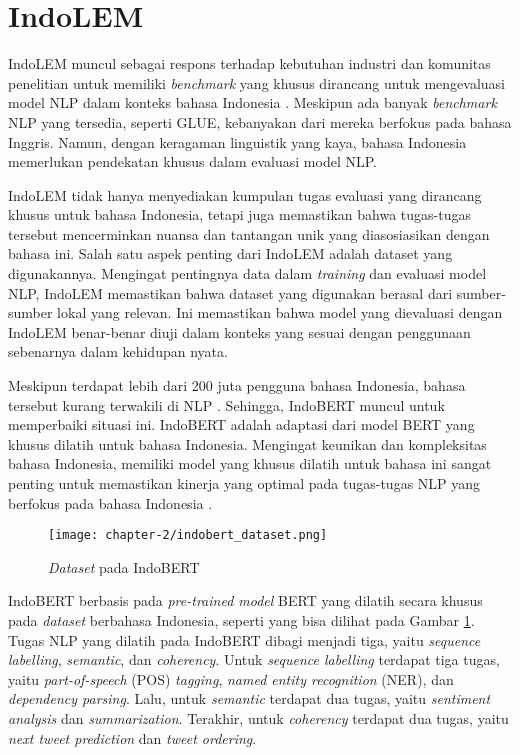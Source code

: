 \section{IndoLEM}
IndoLEM muncul sebagai respons terhadap kebutuhan industri dan komunitas penelitian untuk memiliki \textit{benchmark} yang khusus dirancang untuk mengevaluasi model NLP dalam konteks bahasa Indonesia \parencite{indolem}. Meskipun ada banyak \textit{benchmark} NLP yang tersedia, seperti GLUE, kebanyakan dari mereka berfokus pada bahasa Inggris. Namun, dengan keragaman linguistik yang kaya, bahasa Indonesia memerlukan pendekatan khusus dalam evaluasi model NLP.

IndoLEM tidak hanya menyediakan kumpulan tugas evaluasi yang dirancang khusus untuk bahasa Indonesia, tetapi juga memastikan bahwa tugas-tugas tersebut mencerminkan nuansa dan tantangan unik yang diasosiasikan dengan bahasa ini. Salah satu aspek penting dari IndoLEM adalah dataset yang digunakannya. Mengingat pentingnya data dalam \textit{training} dan evaluasi model NLP, IndoLEM memastikan bahwa dataset yang digunakan berasal dari sumber-sumber lokal yang relevan. Ini memastikan bahwa model yang dievaluasi dengan IndoLEM benar-benar diuji dalam konteks yang sesuai dengan penggunaan sebenarnya dalam kehidupan nyata.

Meskipun terdapat lebih dari 200 juta pengguna bahasa Indonesia, bahasa tersebut kurang terwakili di NLP \parencite{indolem}. Sehingga, IndoBERT muncul untuk memperbaiki situasi ini. IndoBERT adalah adaptasi dari model BERT yang khusus dilatih untuk bahasa Indonesia. Mengingat keunikan dan kompleksitas bahasa Indonesia, memiliki model yang khusus dilatih untuk bahasa ini sangat penting untuk memastikan kinerja yang optimal pada tugas-tugas NLP yang berfokus pada bahasa Indonesia \parencite{indolem}.

\begin{figure}[ht]
    \centering
    \texttt{[image: chapter-2/indobert\_dataset.png]}
    \caption{\textit{Dataset} pada IndoBERT \parencite{indolem}}
    \label{fig:indobert_dataset}
\end{figure}

IndoBERT berbasis pada \textit{pre-trained model} BERT yang dilatih secara khusus pada \textit{dataset} berbahasa Indonesia, seperti yang bisa dilihat pada Gambar \ref{fig:indobert_dataset}. Tugas NLP yang dilatih pada IndoBERT dibagi menjadi tiga, yaitu \textit{sequence labelling}, \textit{semantic}, dan \textit{coherency}. Untuk \textit{sequence labelling} terdapat tiga tugas, yaitu \textit{part-of-speech} (POS) \textit{tagging}, \textit{named entity recognition} (NER), dan \textit{dependency parsing}. Lalu, untuk \textit{semantic} terdapat dua tugas, yaitu \textit{sentiment analysis} dan \textit{summarization}. Terakhir, untuk \textit{coherency} terdapat dua tugas, yaitu \textit{next tweet prediction} dan \textit{tweet ordering}.

